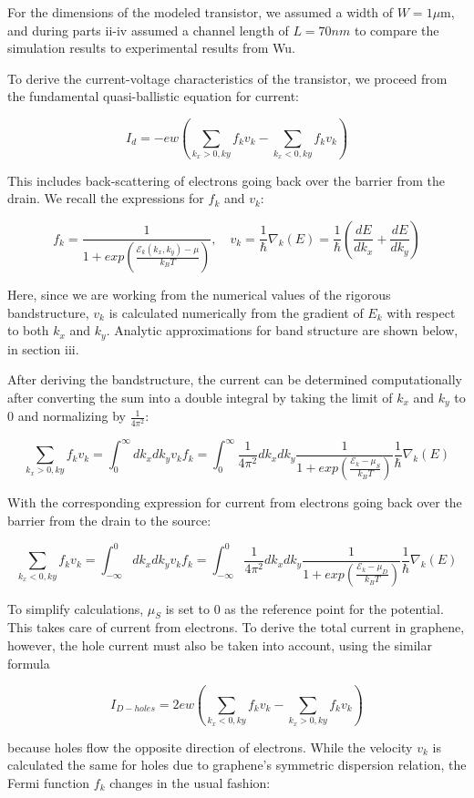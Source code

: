 \documentclass[11pt]{article}
\begin{document}
For the dimensions of the modeled transistor, we assumed a width of $W=1\mu$m, and during parts ii-iv assumed a channel length of $L=70 nm$ to compare the simulation results to experimental results from Wu. 

To derive the current-voltage characteristics of the transistor, we proceed from the fundamental quasi-ballistic equation for current:

$$I_d = -ew(\sum_{k_x>0, ky}f_{k}v_{k} - \sum_{k_x<0, ky}f_{k}v_{k})$$

This includes back-scattering of electrons going back over the barrier from the drain. We recall the expressions for $f_{k}$ and $v_{k}$:

$$f_{k}=\frac{1}{1+exp(\frac{\mathcal{E}_{k}(k_x,k_y) - \mu}{k_BT})}, \hspace{1em} v_{k} = \frac{1}{\hbar}\nabla_k(E)= \frac{1}{\hbar}(\frac{dE}{dk_x}+\frac{dE}{dk_y})$$

Here, since we are working from the numerical values of the rigorous bandstructure, $v_k$ is calculated numerically from the gradient of $E_k$ with respect to both $k_x$ and $k_y$. Analytic approximations for band structure are shown below, in section iii.

After deriving the bandstructure, the current can be determined computationally after converting the sum into a double integral by taking the limit of $k_x$ and $k_y$ to 0 and normalizing by $\frac{1}{4\pi^2}$:

$$\sum_{k_x>0, ky}f_{k}v_{k} =\int_{0}^{\infty}dk_xdk_yv_{k}f_{k} = \int_{0}^{\infty}\frac{1}{4\pi^2}dk_xdk_y\frac{1}{1+exp(\frac{\mathcal{E}_{k} - \mu_S}{k_BT})}\frac{1}{\hbar}\nabla_k(E)$$

With the corresponding expression for current from electrons going back over the barrier from the drain to the source:

$$\sum_{k_x<0, ky}f_{k}v_{k} =\int_{-\infty}^{0}dk_xdk_yv_{k}f_{k} = \int_{-\infty}^{0}\frac{1}{4\pi^2}dk_xdk_y\frac{1}{1+exp(\frac{\mathcal{E}_{k} - \mu_D}{k_BT})}\frac{1}{\hbar}\nabla_k(E)$$

To simplify calculations, $\mu_S$ is set to 0 as the reference point for the potential. This takes care of current from electrons. To derive the total current in graphene, however, the hole current must also be taken into account, using the similar formula

$$I_{D-holes} = 2ew(\sum_{k_x<0, ky}f_{k}v_{k} - \sum_{k_x>0, ky}f_{k}v_{k})$$

because holes flow the opposite direction of electrons. While the velocity $v_k$ is calculated the same for holes due to graphene's symmetric dispersion relation, the Fermi function $f_k$ changes in the usual fashion:
\end{document}
